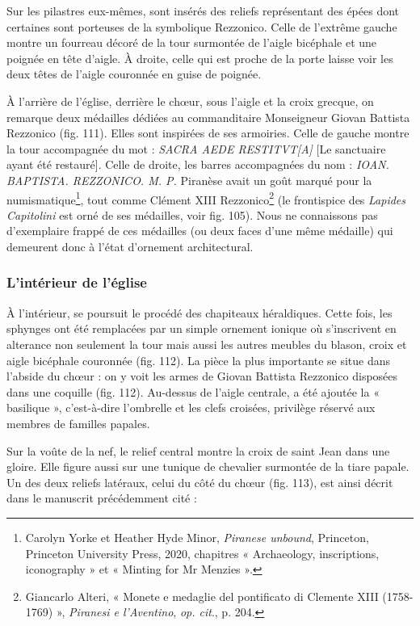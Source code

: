 \documentclass[12pt,twoside,openany]{book}
\begin{document}
Sur les pilastres eux-mêmes, sont insérés des reliefs représentant des épées dont certaines sont porteuses de la symbolique Rezzonico. Celle de l’extrême gauche montre un fourreau décoré de la tour surmontée de l’aigle bicéphale et une poignée en tête d’aigle. À droite, celle qui est proche de la porte laisse voir les deux têtes de l’aigle couronnée en guise de poignée.

À l’arrière de l’église, derrière le chœur, sous l’aigle et la croix grecque, on remarque deux médailles dédiées au commanditaire Monseigneur Giovan Battista Rezzonico (fig. 111). Elles sont inspirées de ses armoiries. Celle de gauche montre la tour accompagnée du mot : \textit{SACRA AEDE RESTITVT[A]} [Le sanctuaire ayant été restauré]. Celle de droite, les barres accompagnées du nom : \textit{IOAN. BAPTISTA. REZZONICO. M. P.} Piranèse avait un goût marqué pour la numismatique\footnote{Carolyn Yorke et Heather Hyde Minor, \textit{Piranese unbound}, Princeton, Princeton University Press, 2020, chapitres « Archaeology, inscriptions, iconography » et « Minting for Mr Menzies ».}, tout comme Clément XIII Rezzonico\footnote{Giancarlo Alteri, « Monete e medaglie del pontificato di Clemente XIII (1758-1769) », \textit{Piranesi e l’Aventino},\textit{ op. cit}., p. 204.} (le frontispice des \textit{Lapides Capitolini} est orné de ses médailles, voir fig. 105). Nous ne connaissons pas d’exemplaire frappé de ces médailles (ou deux faces d’une même médaille) qui demeurent donc à l’état d’ornement architectural.

\subsubsection{L’intérieur de l’église}

À l’intérieur, se poursuit le procédé des chapiteaux héraldiques. Cette fois, les sphynges ont été remplacées par un simple ornement ionique où s’inscrivent en alterance non seulement la tour mais aussi les autres meubles du blason, croix et aigle bicéphale couronnée (fig. 112). La pièce la plus importante se situe dans l’abside du chœur : on y voit les armes de Giovan Battista Rezzonico disposées dans une coquille (fig. 112). Au-dessus de l’aigle centrale, a été ajoutée la « basilique », c’est-à-dire l’ombrelle et les clefs croisées, privilège réservé aux membres de familles papales.

Sur la voûte de la nef, le relief central montre la croix de saint Jean dans une gloire. Elle figure aussi sur une tunique de chevalier surmontée de la tiare papale. Un des deux reliefs latéraux, celui du côté du chœur (fig. 113), est ainsi décrit dans le manuscrit précédemment cité :
\end{document}
